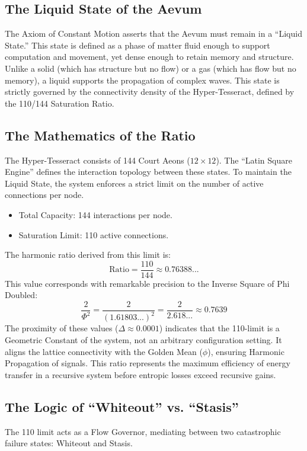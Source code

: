 \documentclass[11pt, letterpaper]{article}
\begin{document}
\subsection{The Liquid State of the Aevum}\label{appendixI.1}
The Axiom of Constant Motion asserts that the Aevum must remain in a ``Liquid State.'' This state is defined as a phase of matter fluid enough to support computation and movement, yet dense enough to retain memory and structure. Unlike a solid (which has structure but no flow) or a gas (which has flow but no memory), a liquid supports the propagation of complex waves. This state is strictly governed by the connectivity density of the Hyper-Tesseract, defined by the 110\slash 144 Saturation Ratio.

\subsection{The Mathematics of the Ratio}\label{appendixI.2}
The Hyper-Tesseract consists of 144 Court Aeons ($12 \times 12$). The ``Latin Square Engine'' defines the interaction topology between these states. To maintain the Liquid State, the system enforces a strict limit on the number of active connections per node.

\begin{itemize}
    \item Total Capacity: 144 interactions per node.
    \item Saturation Limit: 110 active connections.
\end{itemize}

The harmonic ratio derived from this limit is:
\[
\text{Ratio} = \frac{110}{144} \approx 0.76388...
\]
This value corresponds with remarkable precision to the Inverse Square of Phi Doubled:
\[
\frac{2}{\Phi^2} = \frac{2}{(1.61803...)^2} = \frac{2}{2.618...} \approx 0.7639
\]
The proximity of these values ($\Delta \approx 0.0001$) indicates that the 110-limit is a Geometric Constant of the system, not an arbitrary configuration setting. It aligns the lattice connectivity with the Golden Mean ($\phi$), ensuring Harmonic Propagation of signals. This ratio represents the maximum efficiency of energy transfer in a recursive system before entropic losses exceed recursive gains.

\subsection{The Logic of ``Whiteout'' vs. ``Stasis''}\label{appendixI.3}
The 110 limit acts as a Flow Governor, mediating between two catastrophic failure states: Whiteout and Stasis.
\end{document}
